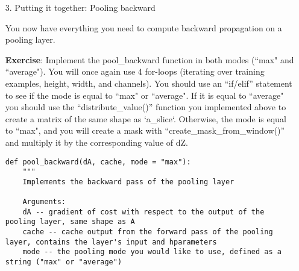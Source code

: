 {\begin{itemize}
\begin{verbatim}
    Arguments:
    dz -- input scalar
    shape -- the shape (n_H, n_W) of the output matrix for which we want to distribute the value of dz
    
    Returns:
    a -- Array of size (n_H, n_W) for which we distributed the value of dz
    """
    
    ### START CODE HERE ###
    # Retrieve dimensions from shape (≈1 line)
    (n_H, n_W) = shape
    
    # Compute the value to distribute on the matrix (≈1 line)
    average =  dz / (n_H * n_W)
    
    # Create a matrix where every entry is the "average" value (≈1 line)
    a = np.ones(shape) * average
    ### END CODE HERE ###
    
    return a
\end{verbatim}

\begin{verbatim}
a = distribute_value(2, (2,2))
print('distributed value =', a)

#output
distributed value = [[ 0.5  0.5]
 [ 0.5  0.5]]
\end{verbatim}



\item[3.]  Putting it together: Pooling backward 

You now have everything you need to compute backward propagation on a pooling layer.

{\textbf{Exercise}}:  Implement the pool\_backward function in both modes (``max" and ``average"). You will once again use 4 for-loops (iterating over training examples, height, width, and channels). You should use an ``if/elif'' statement to see if the mode is equal to ``max" or ``average". If it is equal to ``average" you should use the ``distribute\_value()'' function you implemented above to create a matrix of the same shape as `a\_slice`. Otherwise, the mode is equal to ``max", and you will create a mask with ``create\_mask\_from\_window()'' and multiply it by the corresponding value of dZ.

\begin{verbatim}
def pool_backward(dA, cache, mode = "max"):
    """
    Implements the backward pass of the pooling layer
    
    Arguments:
    dA -- gradient of cost with respect to the output of the pooling layer, same shape as A
    cache -- cache output from the forward pass of the pooling layer, contains the layer's input and hparameters 
    mode -- the pooling mode you would like to use, defined as a string ("max" or "average")
    

\end{verbatim}
\end{itemize}}
